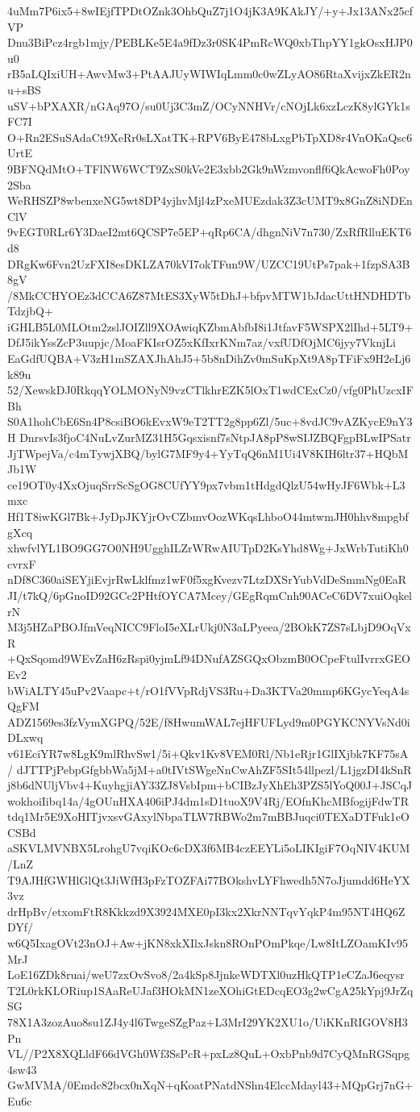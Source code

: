 4uMm7P6ix5+8wIEjfTPDtOZnk3OhbQuZ7j1O4jK3A9KAkJY/+y+Jx13ANx25cfVP
Dnu3BiPcz4rgb1mjy/PEBLKe5E4a9fDz3r0SK4PmRcWQ0xbThpYY1gkOsxHJP0u0
rB5aLQIxiUH+AwvMw3+PtAAJUyWIWIqLmm0c0wZLyAO86RtaXvijxZkER2nu+sBS
uSV+bPXAXR/nGAq97O/su0Uj3C3mZ/OCyNNHVr/cNOjLk6xzLczK8ylGYk1sFC7I
O+Rn2ESuSAdaCt9XeRr0sLXatTK+RPV6ByE478bLxgPbTpXD8r4VnOKaQsc6UrtE
9BFNQdMtO+TFlNW6WCT9ZxS0kVe2E3xbb2Gk9nWzmvonflf6QkAcwoFh0Poy2Sba
WeRHSZP8wbenxeNG5wt8DP4yjhvMjl4zPxeMUEzdak3Z3cUMT9x8GnZ8iNDEnClV
9vEGT0RLr6Y3DaeI2mt6QCSP7e5EP+qRp6CA/dhgnNiV7n730/ZxRfRlluEKT6d8
DRgKw6Fvn2UzFXI8esDKLZA70kVI7okTFun9W/UZCC19UtPs7pak+1fzpSA3B8gV
/8MkCCHYOEz3dCCA6Z87MtES3XyW5tDhJ+bfpvMTW1bJdacUttHNDHDTbTdzjbQ+
iGHLB5L0MLOtm2zslJOIZll9XOAwiqKZbmAbfbI8i1JtfavF5WSPX2lIhd+5LT9+
DfJ5ikYssZcP3uupjc/MoaFKIsrOZ5xKfIxrKNm7az/vxfUDfOjMC6jyy7VknjLi
EaGdfUQBA+V3zH1mSZAXJhAhJ5+5b8nDihZv0mSuKpXt9A8pTFiFx9H2eLj6k89u
52/XewskDJ0RkqqYOLMONyN9vzCTlkhrEZK5lOxT1wdCExCz0/vfg0PhUzcxIFBh
S0A1hohCbE6Sn4P8csiBO6kEvxW9eT2TT2g8pp6Zl/5uc+8vdJC9vAZKycE9nY3H
DnrsvIs3fjoC4NuLvZurMZ31H5Gqsxisnf7sNtpJA8pP8wSIJZBQFgpBLwIPSatr
JjTWpejVa/c4mTywjXBQ/bylG7MF9y4+YyTqQ6nM1Ui4V8KIH6ltr37+HQbMJb1W
ce19OT0y4XxOjuqSrrScSgOG8CUfYY9px7vbm1tHdgdQlzU54wHyJF6Wbk+L3mxc
Hf1T8iwKGl7Bk+JyDpJKYjrOvCZbmvOozWKqsLhboO44mtwmJH0hhv8mpgbfgXcq
xhwfvlYL1BO9GG7O0NH9UgghILZrWRwAIUTpD2KsYhd8Wg+JxWrbTutiKh0cvrxF
nDf8C360aiSEYjiEvjrRwLklfmz1wF0f5xgKvezv7LtzDXSrYubVdDeSmmNg0EaR
JI/t7kQ/6pGnoID92GCc2PHtfOYCA7Mcey/GEgRqmCnh90ACeC6DV7xuiOqkelrN
M3j5HZaPBOJfmVeqNICC9FloI5eXLrUkj0N3aLPyeea/2BOkK7ZS7sLbjD9OqVxR
+QxSqomd9WEvZaH6zRspi0yjmLf94DNufAZSGQxObzmB0OCpeFtulIvrrxGEOEv2
bWiALTY45uPv2Vaapc+t/rO1fVVpRdjVS3Ru+Da3KTVa20mmp6KGycYeqA4sQgFM
ADZ1569es3fzVymXGPQ/52E/f8HwumWAL7ejHFUFLyd9m0PGYKCNYVsNd0iDLxwq
v61EciYR7w8LgK9mlRhvSw1/5i+Qkv1Kv8VEM0Rl/Nb1eRjr1GlIXjbk7KF75sA/
dJTTPjPebpGfgbbWa5jM+a0tIVtSWgeNnCwAhZF5SIt54llpezl/L1jgzDI4kSnR
j8b6dNUljVbv4+KuyhgjiAY33ZJ8VsbIpm+bCIBzJyXhEh3PZS5lYoQ00J+JSCqJ
wokhoiIibq14a/4gOUnHXA406iPJ4dm1sD1tuoX9V4Rj/EOfnKhcMBfogijFdwTR
tdq1Mr5E9XoHITjvxsvGAxylNbpaTLW7RBWo2m7mBBJuqci0TEXaDTFuk1eOCSBd
aSKVLMVNBX5LrohgU7vqiKOc6cDX3f6MB4czEEYLi5oLIKIgiF7OqNIV4KUM/LnZ
T9AJHfGWHlGlQt3JiWfH3pFzTOZFAi77BOkshvLYFhwedh5N7oJjumdd6HeYX3vz
drHpBv/etxomFtR8Kkkzd9X3924MXE0pI3kx2XkrNNTqvYqkP4m95NT4HQ6ZDYf/
w6Q5IxagOVt23nOJ+Aw+jKN8xkXIlxJskn8ROnPOmPkqe/Lw8ItLZOamKIv95MrJ
LoE16ZDk8ruai/weU7zxOvSvo8/2a4kSp8JjnkeWDTXl0uzHkQTP1eCZaJ6eqysr
T2L0rkKLORiup1SAaReUJaf3HOkMN1zeXOhiGtEDcqEO3g2wCgA25kYpj9JrZqSG
78X1A3zozAuo8su1ZJ4y4l6TwgeSZgPaz+L3MrI29YK2XU1o/UiKKnRIGOV8H3Pn
VL//P2X8XQLldF66dVGh0Wf3SsPcR+pxLz8QuL+OxbPnb9d7CyQMnRGSqpg4sw43
GwMVMA/0Emdc82bcx0nXqN+qKoatPNatdNShn4ElccMdayl43+MQpGrj7nG+Eu6c

